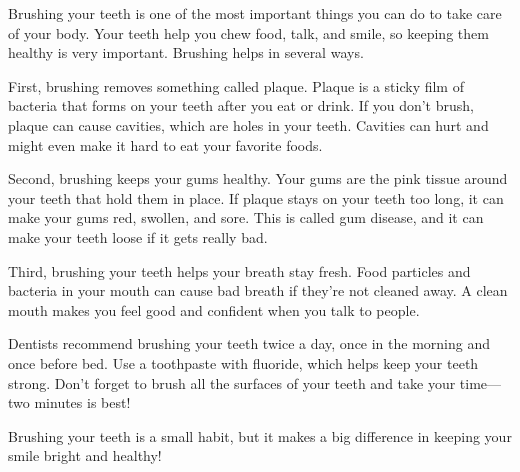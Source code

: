 \documentclass[12pt]{article}
\begin{document}
\begin{tcolorbox}[colframe=black!60, colback=white, 
coltitle=black, colbacktitle=black!15, fonttitle=\bfseries\Large, 
title=Text: Why Brushing Your Teeth is Important, halign title=center, left=10pt, right=10pt, top=10pt, bottom=15pt]
Brushing your teeth is one of the most important things you can do to take care of your body. Your teeth help you chew food, talk, and smile, so keeping them healthy is very important. Brushing helps in several ways.

First, brushing removes something called plaque. Plaque is a sticky film of bacteria that forms on your teeth after you eat or drink. If you don’t brush, plaque can cause cavities, which are holes in your teeth. Cavities can hurt and might even make it hard to eat your favorite foods.

Second, brushing keeps your gums healthy. Your gums are the pink tissue around your teeth that hold them in place. If plaque stays on your teeth too long, it can make your gums red, swollen, and sore. This is called gum disease, and it can make your teeth loose if it gets really bad.

Third, brushing your teeth helps your breath stay fresh. Food particles and bacteria in your mouth can cause bad breath if they’re not cleaned away. A clean mouth makes you feel good and confident when you talk to people.

Dentists recommend brushing your teeth twice a day, once in the morning and once before bed. Use a toothpaste with fluoride, which helps keep your teeth strong. Don’t forget to brush all the surfaces of your teeth and take your time—two minutes is best!

Brushing your teeth is a small habit, but it makes a big difference in keeping your smile bright and healthy!


 

     \end{tcolorbox}
\end{document}
